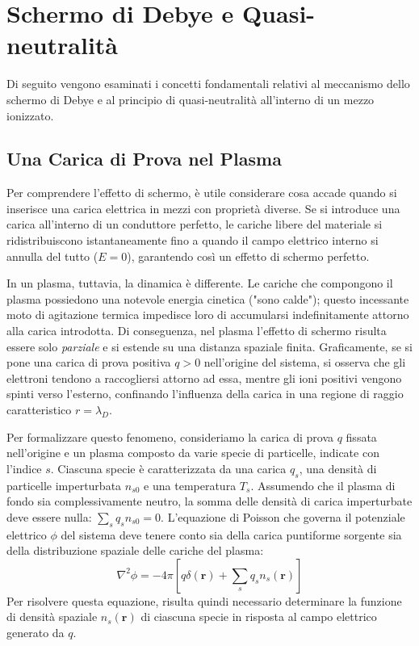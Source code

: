 \section{Schermo di Debye e Quasi-neutralità}
Di seguito vengono esaminati i concetti fondamentali relativi al meccanismo dello schermo di Debye e al principio di quasi-neutralità all'interno di un mezzo ionizzato.

\subsection{Una Carica di Prova nel Plasma}
Per comprendere l'effetto di schermo, è utile considerare cosa accade quando si inserisce una carica elettrica in mezzi con proprietà diverse. Se si introduce una carica all'interno di un conduttore perfetto, le cariche libere del materiale si ridistribuiscono istantaneamente fino a quando il campo elettrico interno si annulla del tutto ($E=0$), garantendo così un effetto di schermo perfetto.

In un plasma, tuttavia, la dinamica è differente. Le cariche che compongono il plasma possiedono una notevole energia cinetica ("sono calde"); questo incessante moto di agitazione termica impedisce loro di accumularsi indefinitamente attorno alla carica introdotta. Di conseguenza, nel plasma l'effetto di schermo risulta essere solo \textit{parziale} e si estende su una distanza spaziale finita. Graficamente, se si pone una carica di prova positiva $q > 0$ nell'origine del sistema, si osserva che gli elettroni tendono a raccogliersi attorno ad essa, mentre gli ioni positivi vengono spinti verso l'esterno, confinando l'influenza della carica in una regione di raggio caratteristico $r = \lambda_D$.

Per formalizzare questo fenomeno, consideriamo la carica di prova $q$ fissata nell'origine e un plasma composto da varie specie di particelle, indicate con l'indice $s$. Ciascuna specie è caratterizzata da una carica $q_s$, una densità di particelle imperturbata $n_{s0}$ e una temperatura $T_s$. Assumendo che il plasma di fondo sia complessivamente neutro, la somma delle densità di carica imperturbate deve essere nulla: $\sum_s q_s n_{s0} = 0$. L'equazione di Poisson che governa il potenziale elettrico $\phi$ del sistema deve tenere conto sia della carica puntiforme sorgente sia della distribuzione spaziale delle cariche del plasma:
\begin{equation}
\nabla^2 \phi = -4\pi \left[ q \delta(\mathbf{r}) + \sum_s q_s n_s(\mathbf{r}) \right]
\end{equation}
Per risolvere questa equazione, risulta quindi necessario determinare la funzione di densità spaziale $n_s(\mathbf{r})$ di ciascuna specie in risposta al campo elettrico generato da $q$.

